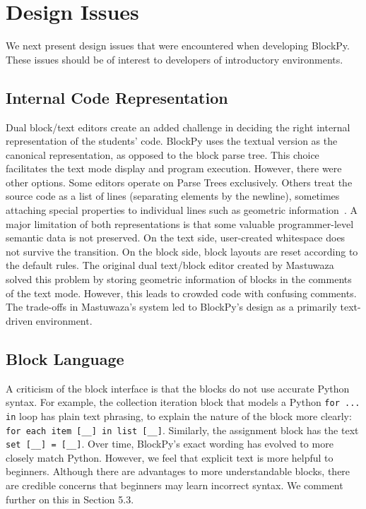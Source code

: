 \documentclass[10pt,journal,compsoc]{IEEEtran}
\begin{document}
\section{Design Issues}

We next present design issues that were encountered when developing BlockPy.
These issues should be of interest to developers of introductory environments.

\subsection{Internal Code Representation}

Dual block/text editors create an added challenge in deciding the right internal representation of the students' code.
BlockPy uses the textual version as the canonical representation, as opposed to the block parse tree.
This choice facilitates the text mode display and program execution. 
However, there were other options.
Some editors operate on Parse Trees exclusively.
Others treat the source code as a list of lines (separating elements by the newline), sometimes attaching special properties to individual lines such as geometric information~\cite{Bau}.
A major limitation of both representations is that some valuable programmer-level semantic data is not preserved.
On the text side, user-created whitespace does not survive the transition.
On the block side, block layouts are reset according to the default rules.
The original dual text/block editor created by Mastuwaza~\cite{Matsuzawa} solved this problem by storing geometric information of blocks in the comments of the text mode.
However, this leads to crowded code with confusing comments.
The trade-offs in Mastuwaza's system led to BlockPy's design as a primarily text-driven environment.

\subsection{Block Language}

A criticism of the block interface is that the blocks do not use accurate Python syntax.
For example, the collection iteration block that models a Python \texttt{for ... in} loop has plain text phrasing, to explain the nature of the block more clearly: \texttt{for each item [\_\_] in list [\_\_]}.
Similarly, the assignment block has the text \texttt{set [\_\_] = [\_\_]}.
Over time, BlockPy's exact wording has evolved to more closely match Python.
However, we feel that explicit text is more helpful to beginners.
Although there are advantages to more understandable blocks, there are credible concerns that beginners may learn incorrect syntax.
We comment further on this in Section 5.3.
\end{document}

